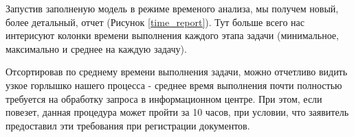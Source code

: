 Запустив заполненую модель в режиме временого анализа,
мы получем новый, более детальный, отчет (Рисунок
\ref{time_report}). Тут больше всего нас интерисуют колонки
времени выполнения каждого этапа задачи (минимальное,
максимально и среднее на каждую задачу).

Отсортировав по среднему времени выполнения задачи,
можно отчетливо видить узкое горлышко нашего процесса -
среднее время выполнения почти полностью требуется на обработку
запроса в информационном центре. При этом, если повезет,
данная процедура может пройти за 10 часов, при условии, что
заявитель предоставил эти требования при регистрации документов.

